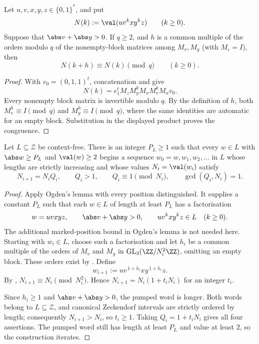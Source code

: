 \begin{lemma}
  \label{lem:zeckendorf-paired-pumping-congruence}
  Let \(u,v,x,y,z\in\{0,1\}^\ast\), and put
  \[
    N(k):=\val(uv^kxy^kz)\qquad(k\ge0).
  \]
  Suppose that \(\abs v+\abs y>0\). If \(q\ge2\), and \(h\) is a
  common multiple of the orders modulo \(q\) of the nonempty-block
  matrices among \(M_v,M_y\) (with \(M_\varepsilon=I\)), then
  \[
    N(k+h)\equiv N(k)\pmod q
    \qquad(k\ge0).
  \]
\end{lemma}

\begin{proof}
  With \(v_0=(0,1,1)^t\), concatenation and
   give
  \[
    N(k)=e_1^tM_zM_y^kM_xM_v^kM_uv_0.
  \]
  Every nonempty block matrix is invertible modulo \(q\). By the
  definition of \(h\), both \(M_v^h\equiv I\pmod q\) and
  \(M_y^h\equiv I\pmod q\), where the same identities are automatic for
  an empty block. Substitution in the displayed product proves the
  congruence.
\end{proof}

\begin{theorem}
  \label{thm:context-free-coprime-quotient-zeckendorf-pumping}
  Let \(L\subseteq\mathcal Z\) be context-free. There is an integer
  \(P_L\ge1\) such that every \(w\in L\) with
  \(\abs w\ge P_L\) and \(\val(w)\ge2\) begins a sequence
  \(w_0=w,w_1,w_2,\ldots\) in \(L\) whose lengths are strictly
  increasing and whose values \(N_i=\val(w_i)\) satisfy
  \[
    N_{i+1}=N_iQ_i,\qquad Q_i>1,\qquad
    Q_i\equiv1\pmod {N_i},\qquad \gcd(Q_i,N_i)=1.
  \]
\end{theorem}

\begin{proof}
  Apply Ogden's lemma with every position distinguished. It supplies a
  constant \(P_L\) such that each \(w\in L\) of length at least \(P_L\)
  has a factorisation
  \[
    w=uvxyz,\qquad \abs v+\abs y>0,\qquad
    uv^kxy^kz\in L\quad(k\ge0).
  \]
  The additional marked-position bound in Ogden's lemma is not needed
  here. Starting with \(w_i\in L\), choose such a factorisation and
  let \(h_i\) be a common multiple of the orders of \(M_v\) and \(M_y\)
  in
  \(\operatorname{GL}_3(\ZZ/N_i^2\ZZ)\), omitting an empty block. These
  orders exist by
  . Define
  \[
    w_{i+1}:=uv^{\,1+h_i}xy^{\,1+h_i}z.
  \]
  By ,
  \(N_{i+1}\equiv N_i\pmod {N_i^2}\). Hence
  \(N_{i+1}=N_i(1+t_iN_i)\) for an integer \(t_i\).

  Since \(h_i\ge1\) and \(\abs v+\abs y>0\), the pumped word is longer.
  Both words belong to \(L\subseteq\mathcal Z\), and canonical
  Zeckendorf intervals are strictly ordered by length; consequently
  \(N_{i+1}>N_i\), so \(t_i\ge1\). Taking
  \(Q_i=1+t_iN_i\) gives all four assertions. The pumped word still has
  length at least \(P_L\) and value at least \(2\), so the construction
  iterates.
\end{proof}

